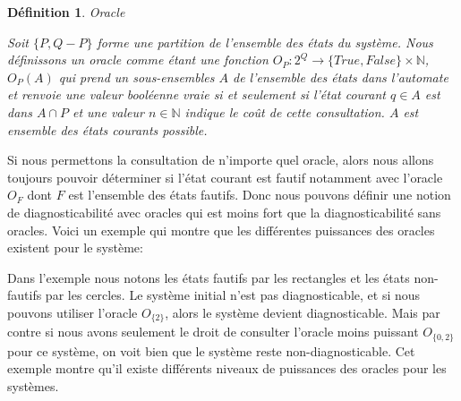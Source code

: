 \documentclass[a4paper,10pt]{article}
\newtheorem{mydef}{D\'efinition}
\begin{document}
\begin{mydef}{Oracle}

  Soit $\{P,Q-P\}$ forme une partition de l'ensemble des \'etats du syst\`eme. Nous d\'efinissons un oracle comme \'etant une fonction $O_P: 2^Q \to \{True,False\} \times \mathbb{N}$, $O_P(A)$ qui prend un sous-ensembles $A$ de l'ensemble des \'etats dans l'automate et renvoie une valeur bool\'eenne vraie si et seulement si l'\'etat courant $q\in A$ est dans $A\cap P$ et une valeur $n \in \mathbb{N}$ indique le co\^ut de cette consultation. $A$ est ensemble des \'etats courants possible.

\end{mydef}

Si nous permettons la consultation de n'importe quel oracle, alors nous allons toujours pouvoir d\'eterminer si l'\'etat courant est fautif notamment avec l'oracle $O_F$ dont $F$ est l'ensemble des \'etats fautifs. Donc nous pouvons d\'efinir une notion de diagnosticabilit\'e avec oracles qui est moins fort que la diagnosticabilit\'e sans oracles. Voici un exemple qui montre que les diff\'erentes puissances des oracles existent pour le syst\`eme:

\begin{figure}[H]
  \begin{center}
  \end{center}
\end{figure}

Dans l'exemple nous notons les \'etats fautifs par les rectangles et les \'etats non-fautifs par les cercles. Le syst\`eme initial n'est pas diagnosticable, et si nous pouvons utiliser l'oracle $O_{\{2\}}$, alors le système devient diagnosticable. Mais par contre si nous avons seulement le droit de consulter l'oracle moins puissant $O_{\{0,2\}}$ pour ce système, on voit bien que le système reste non-diagnosticable. Cet exemple montre qu'il existe différents niveaux de puissances des oracles pour les systèmes.
\end{document}
